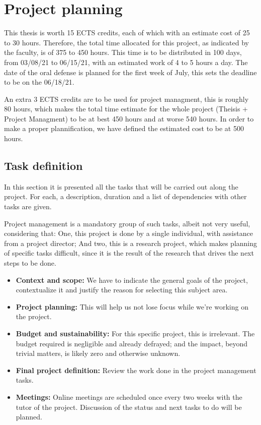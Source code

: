 
\chapter{Project planning} %
\label{Chapter2} %


This thesis is worth 15 ECTS credits, each of which with an estimate cost of 25 to 30 hours. Therefore, the total time allocated for this project, as indicated by the faculty, is of 375 to 450 hours. This time is to be distributed in 100 days, from 03/08/21 to 06/15/21, with an estimated work of 4 to 5 hours a day. The date of the oral defense is planned for the first week of July, this sets the deadline to be on the 06/18/21.

An extra 3 ECTS credits are to be used for project managment, this is roughly 80 hours, which makes the total time estimate for the whole project (Theisis + Project Managment) to be at best 450 hours and at worse 540 hours. In order to make a proper plannification, we have defined the estimated cost to be at 500 hours.

\section{Task definition}
\label{sec:tasks}
In this section it is presented all the tasks that will be carried out along the project. For each, a description, duration and a list of dependencies with other tasks are given.

Project management is a mandatory group of such tasks, albeit not very useful, considering that: One, this project is done by a single individual, with assistance from a project director; And two, this is a research project, which makes planning of specific tasks difficult, since it is the result of the research that drives the next steps to be done.

\begin{itemize}
    \item \textbf{Context and scope:} We have to indicate the general goals of the project, con\-tex\-tu\-al\-ize it and justify the reason for selecting this subject area.
    \item \textbf{Project planning:} This will help us not lose focus while we're working on the project.
    \item \textbf{Budget and sustainability:} For this specific project, this is irrelevant. The budget required is negligible and already defrayed; and the impact, beyond trivial matters, is likely zero and otherwise unknown. 
    \item \textbf{Final project definition:} Review the work done in the project management tasks.
    \item \textbf{Meetings:} Online meetings are scheduled once every two weeks with the tutor of the project. Discussion of the status and next tasks to do will be planned.
\end{itemize}

